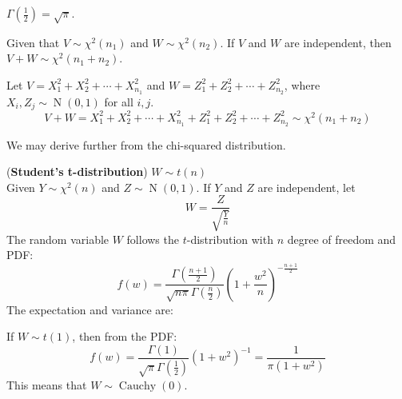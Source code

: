 \documentclass{huhtakm-template-book}
\DeclareMathOperator{\N}{N}
\DeclareMathOperator{\Cauchy}{Cauchy}
\begin{document}
\begin{rem}
	$\Gamma(\frac{1}{2})=\sqrt{\pi}$.
\end{rem}
\begin{lem}
	\label{Chapter 5 (Lemma) Additivity of chi-squared distribution}
	Given that $V\sim\chi^{2}(n_{1})$ and $W\sim\chi^{2}(n_{2})$. If $V$ and $W$ are independent, then $V+W\sim\chi^{2}(n_{1}+n_{2})$.
\end{lem}
\begin{proofing}
	Let $V=X_{1}^{2}+X_{2}^{2}+\cdots+X_{n_{1}}^{2}$ and $W=Z_{1}^{2}+Z_{2}^{2}+\cdots+Z_{n_{2}}^{2}$, where $X_{i},Z_{j}\sim\N(0,1)$ for all $i,j$.
	\begin{equation*}
		V+W=X_{1}^{2}+X_{2}^{2}+\cdots+X_{n_{1}}^{2}+Z_{1}^{2}+Z_{2}^{2}+\cdots+Z_{n_{2}}^{2}\sim\chi^{2}(n_{1}+n_{2})
	\end{equation*}
\end{proofing}
\newpage
We may derive further from the chi-squared distribution.
\begin{eg}(\textbf{Student's t-distribution}) $W\sim t(n)$\\
	Given $Y\sim\chi^{2}(n)$ and $Z\sim\N(0,1)$. If $Y$ and $Z$ are independent, let
	\begin{equation*}
		W=\frac{Z}{\sqrt{\frac{Y}{n}}}
	\end{equation*}
	The random variable $W$ follows the $t$-distribution with $n$ degree of freedom and PDF:
	\begin{equation*}
		f(w)=\frac{\Gamma\left(\frac{n+1}{2}\right)}{\sqrt{n\pi}\Gamma\left(\frac{n}{2}\right)}\left(1+\frac{w^{2}}{n}\right)^{-\frac{n+1}{2}}
	\end{equation*}
	The expectation and variance are:
	
\end{eg}
\begin{rem}
	If $W\sim t(1)$, then from the PDF:
	\begin{equation*}
		f(w)=\frac{\Gamma(1)}{\sqrt{\pi}\Gamma\left(\frac{1}{2}\right)}(1+w^{2})^{-1}=\frac{1}{\pi(1+w^{2})}
	\end{equation*}
	This means that $W\sim\Cauchy(0)$.
\end{rem}
\end{document}
